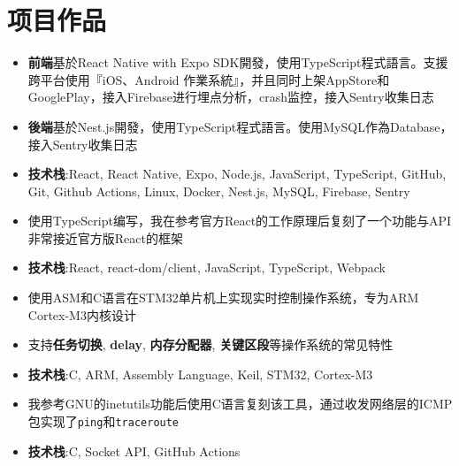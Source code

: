 \documentclass{resume}
\newcommand{\iconsection}[2]{
    \section[\texorpdfstring{#2}{#2}]{\faIcon{#1}\quad #2}
}
\begin{document}
    \iconsection{list}{项目作品}
            \begin{itemize}
                \item \textbf{前端}基於React Native with Expo SDK開發，使用TypeScript程式語言。支援跨平台使用『iOS、Android 作業系統』，并且同时上架AppStore和GooglePlay，接入Firebase进行埋点分析，crash监控，接入Sentry收集日志
                \item \textbf{後端}基於Nest.js開發，使用TypeScript程式語言。使用MySQL作為Database，接入Sentry收集日志
                \item \textbf{技术栈}:React, React Native, Expo, Node.js, JavaScript, TypeScript, GitHub, Git, Github Actions, Linux, Docker, Nest.js, MySQL, Firebase, Sentry
            \end{itemize}
            \begin{itemize}
                \item 使用TypeScript编写，我在参考官方React的工作原理后复刻了一个功能与API非常接近官方版React的框架
                \item \textbf{技术栈}:React, react-dom/client, JavaScript, TypeScript, Webpack
            \end{itemize}
            \begin{itemize}
                \item 使用ASM和C语言在STM32单片机上实现实时控制操作系统，专为ARM Cortex-M3内核设计
                \item 支持\textbf{任务切换}, \textbf{delay}, \textbf{内存分配器}, \textbf{关键区段}等操作系统的常见特性
                \item \textbf{技术栈}:C, ARM, Assembly Language, Keil, STM32, Cortex-M3
            \end{itemize}
            \begin{itemize}
                \item 我参考GNU的inetutils功能后使用C语言复刻该工具，通过收发网络层的ICMP包实现了\texttt{ping}和\texttt{traceroute}
                \item \textbf{技术栈}:C, Socket API, GitHub Actions
            \end{itemize}
\end{document}
